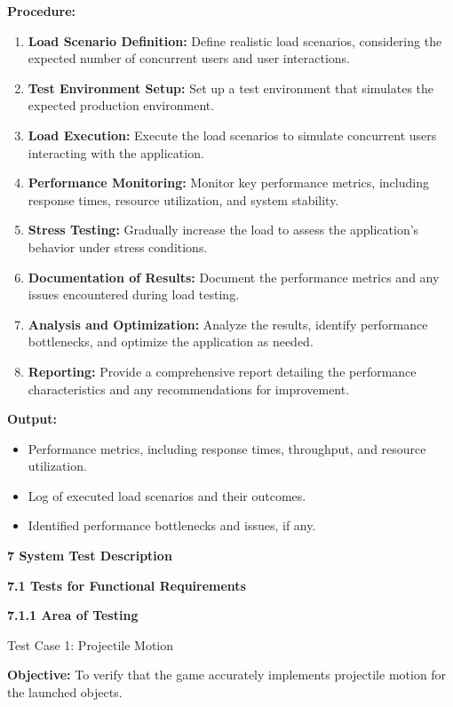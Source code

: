 \documentclass[
]{article}
\begin{document}
\textbf{Procedure:}

\begin{enumerate}
\def\labelenumi{\arabic{enumi}.}
\item
  \textbf{Load Scenario Definition:} Define realistic load scenarios,
  considering the expected number of concurrent users and user
  interactions.
\item
  \textbf{Test Environment Setup:} Set up a test environment that
  simulates the expected production environment.
\item
  \textbf{Load Execution:} Execute the load scenarios to simulate
  concurrent users interacting with the application.
\item
  \textbf{Performance Monitoring:} Monitor key performance metrics,
  including response times, resource utilization, and system stability.
\item
  \textbf{Stress Testing:} Gradually increase the load to assess the
  application's behavior under stress conditions.
\item
  \textbf{Documentation of Results:} Document the performance metrics
  and any issues encountered during load testing.
\item
  \textbf{Analysis and Optimization:} Analyze the results, identify
  performance bottlenecks, and optimize the application as needed.
\item
  \textbf{Reporting:} Provide a comprehensive report detailing the
  performance characteristics and any recommendations for improvement.
\end{enumerate}

\textbf{Output:}

\begin{itemize}
\item
  Performance metrics, including response times, throughput, and
  resource utilization.
\item
  Log of executed load scenarios and their outcomes.
\item
  Identified performance bottlenecks and issues, if any.
\end{itemize}

\textbf{7 System Test Description}

\textbf{7.1 Tests for Functional Requirements}

\textbf{7.1.1 Area of Testing}

Test Case 1: Projectile Motion

\textbf{Objective:} To verify that the game accurately implements
projectile motion for the launched objects.
\end{document}
